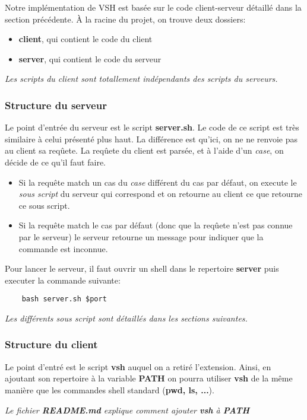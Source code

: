 \documentclass[titlepage]{article}
\begin{document}
	Notre implémentation de VSH est basée sur le code client-serveur détaillé dans la section précédente.
	À la racine du projet, on trouve deux dossiers:
	\begin{itemize}  
		\item \textbf{client}, qui contient le code du client 
		\item \textbf{server}, qui contient le code du serveur
	\end{itemize}

	\textit{Les scripts du client sont totallement indépendants des scripts du serveurs.}

	\subsubsection{Structure du serveur}
	Le point d'entrée du serveur est le script \textbf{server.sh}. Le code de ce script est très similaire à celui présenté plus haut. La différence est qu'ici, on ne ne renvoie pas au client sa reqûete. La reqûete du client est parsée, et à l'aide d'un \textit{case}, on décide de ce qu'il faut faire.
	\begin{itemize}  
		\item Si la requête match un cas du \textit{case} différent du cas par défaut, on execute le \textit{sous script} du serveur qui correspond et on retourne au client ce que retourne ce sous script.
		\item Si la requête match le cas par défaut (donc que la reqûete n'est pas connue par le serveur) le serveur retourne un message pour indiquer que la commande est inconnue.
	\end{itemize}

	Pour lancer le serveur, il faut ouvrir un shell dans le repertoire \textbf{server} puis executer la commande suivante:

	\begin{lstlisting}
	bash server.sh $port
	\end{lstlisting}

	\textit{Les différents sous script sont détaillés dans les sections suivantes.}

	\subsubsection{Structure du client}

	Le point d'entré est le script \textbf{vsh} auquel on a retiré l'extension. Ainsi, en ajoutant son repertoire à la variable \textbf{PATH} on pourra utiliser \textbf{vsh} de la même manière que les commandes shell standard (\textbf{pwd, ls, ...}). \par
	\textit{Le fichier \textbf{README.md} explique comment ajouter \textbf{vsh} à \textbf{PATH}}
\end{document}
